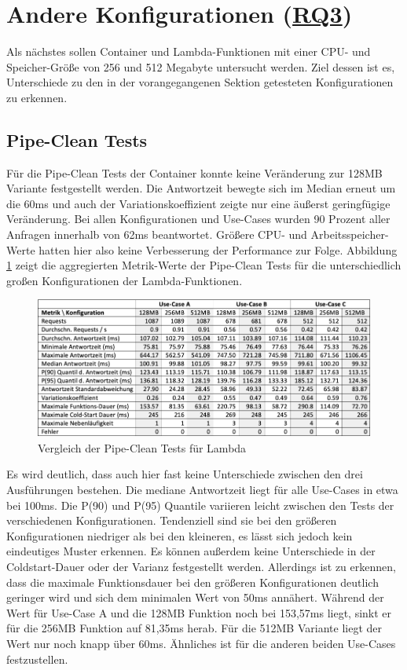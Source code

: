 \section{Andere Konfigurationen (\hyperref[tab:research-questions]{RQ3})}
Als nächstes sollen Container und Lambda-Funktionen mit einer CPU- und Speicher-Größe von 256 und 512 Megabyte untersucht werden. Ziel dessen ist es, Unterschiede zu den in der vorangegangenen Sektion getesteten Konfigurationen zu erkennen.

\subsection{Pipe-Clean Tests}
Für die Pipe-Clean Tests der Container konnte keine Veränderung zur 128MB Variante festgestellt werden. Die Antwortzeit bewegte sich im Median erneut um die 60ms und auch der Variationskoeffizient zeigte nur eine äußerst geringfügige Veränderung. Bei allen Konfigurationen und Use-Cases wurden 90 Prozent aller Anfragen innerhalb von 62ms beantwortet. Größere CPU- und Arbeitsspeicher-Werte hatten hier also keine Verbesserung der Performance zur Folge.
Abbildung \ref{fig:pipe-comparison} zeigt die aggregierten Metrik-Werte der Pipe-Clean Tests für die unterschiedlich großen Konfigurationen der Lambda-Funktionen.

\begin{figure}[H]
    \includegraphics[width=\textwidth]{img/pipe-comparison.png}
    \caption[Vergleich der Pipe-Clean Tests für Lambda]{Vergleich der Pipe-Clean Tests für Lambda}
    \label{fig:pipe-comparison}
\end{figure}

Es wird deutlich, dass auch hier fast keine Unterschiede zwischen den drei Ausführungen bestehen. Die mediane Antwortzeit liegt für alle Use-Cases in etwa bei 100ms. Die P(90) und P(95) Quantile variieren leicht zwischen den Tests der verschiedenen Konfigurationen. Tendenziell sind sie bei den größeren Konfigurationen niedriger als bei den kleineren, es lässt sich jedoch kein eindeutiges Muster erkennen. Es können außerdem keine Unterschiede in der Coldstart-Dauer oder der Varianz festgestellt werden. 
Allerdings ist zu erkennen, dass die maximale Funktionsdauer bei den größeren Konfigurationen deutlich geringer wird und sich dem minimalen Wert von 50ms annähert. Während der Wert für Use-Case A und die 128MB Funktion noch bei 153,57ms liegt, sinkt er für die 256MB Funktion auf 81,35ms herab. Für die 512MB Variante liegt der Wert nur noch knapp über 60ms. Ähnliches ist für die anderen beiden Use-Cases festzustellen.

